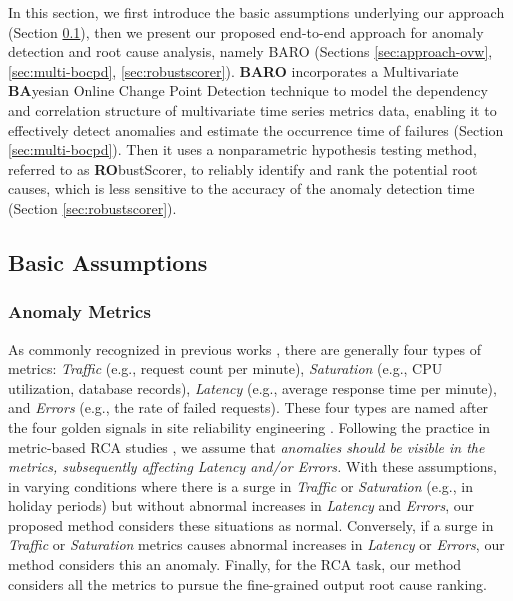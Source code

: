 
In this section, we first introduce the basic assumptions underlying our approach (Section \ref{sec:assumption-causal}), then we present our proposed end-to-end approach for anomaly detection and root cause analysis, namely BARO (Sections \ref{sec:approach-ovw}, \ref{sec:multi-bocpd}, \ref{sec:robustscorer}). \textbf{BARO} incorporates a Multivariate \textbf{BA}yesian Online Change Point Detection technique to model the dependency and correlation structure of multivariate time series metrics data, enabling it to effectively detect anomalies and estimate the occurrence time of failures
(Section \ref{sec:multi-bocpd}). Then it uses a nonparametric hypothesis testing method, referred to as \textbf{RO}bustScorer, to reliably identify and rank the potential root causes, which is less sensitive to the accuracy of the anomaly detection time (Section \ref{sec:robustscorer}). 


 
\subsection{Basic Assumptions} \label{sec:assumption-causal}

\subsubsection{Anomaly Metrics} \label{sec:anomaly-metric-selection}

As commonly recognized in previous works \cite{Li2022Circa, yu2023cmdiagnostor, liu2021microhecl}, there are generally four types of metrics: \textit{Traffic} (e.g., request count per minute), \textit{Saturation} (e.g., CPU utilization, database records), \textit{Latency} (e.g., average response time per minute), and \textit{Errors} (e.g., the rate of failed requests). These four types are named after the four golden signals in site reliability engineering \cite{googlesre}. Following the practice in metric-based RCA studies \cite{yu2023cmdiagnostor, Xin2023CausalRCA, Jinjin2018Microscope, Li2022Circa, Azam2022rcd}, we assume that \textit{anomalies should be visible in the metrics, subsequently affecting \textit{Latency} and/or \textit{Errors}.} With these assumptions, in varying conditions where there is a surge in \textit{Traffic} or \textit{Saturation} (e.g., in holiday periods) but without abnormal increases in \textit{Latency} and \textit{Errors}, our proposed method considers these situations as normal. Conversely, if a surge in \textit{Traffic} or \textit{Saturation} metrics causes abnormal increases in \textit{Latency} or \textit{Errors}, our method considers this an anomaly. Finally, for the RCA task, our method considers all the metrics to pursue the fine-grained output root cause ranking.


